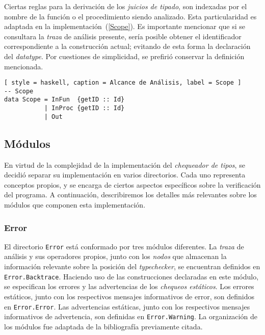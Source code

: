 
Ciertas reglas para la derivación de los \textit{juicios de tipado}, son indexadas por el nombre de la función o el procedimiento siendo analizado.
Esta particularidad es adaptada en la implementación~(\ref{Scope}).
Es importante mencionar que si se consultara la \textit{traza} de análisis presente, sería posible obtener el identificador correspondiente a la construcción actual; evitando de esta forma la declaración del \textit{datatype}.
Por cuestiones de simplicidad, se prefirió conservar la definición mencionada.

\begin{lstlisting}[ style = haskell, caption = Alcance de Análisis, label = Scope ]
-- Scope
data Scope = InFun  {getID :: Id}
           | InProc {getID :: Id}
           | Out
\end{lstlisting}


\subsection{Módulos}

En virtud de la complejidad de la implementación del \textit{chequeador de tipos}, se decidió separar su implementación en varios directorios.
Cada uno representa conceptos propios, y se encarga de ciertos aspectos específicos sobre la verificación del programa.
A continuación, describiremos los detalles más relevantes sobre los módulos que componen esta implementación. %

\subsubsection{Error}

El directorio \lstinline[style = module]{Error} está conformado por tres módulos diferentes.
La \textit{traza} de análisis y sus operadores propios, junto con los \textit{nodos} que almacenan la información relevante sobre la posición del \textit{typechecker}, se encuentran definidos en \lstinline[style = module]{Error.Backtrace}.
Haciendo uso de las construcciones declaradas en este módulo, se especifican los errores y las advertencias de los \textit{chequeos estáticos}.
Los errores estáticos, junto con los respectivos mensajes informativos de error, son definidos en \lstinline[style = module]{Error.Error}.
Las advertencias estáticas, junto con los respectivos mensajes informativos de advertencia, son definidas en \lstinline[style = module]{Error.Warning}.
La organización de los módulos fue adaptada de la bibliografía previamente citada.

